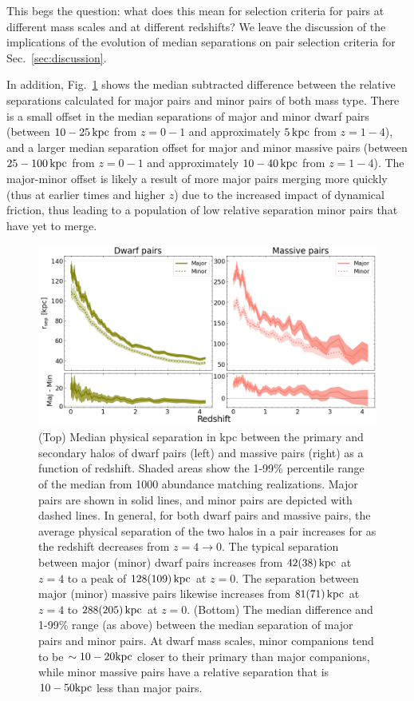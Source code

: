 \documentclass[twocolumn]{aastex631}
\begin{document}
This begs the question: what does this mean for selection criteria for pairs at different mass scales and at different redshifts? We leave the discussion of the implications of the evolution of median separations on pair selection criteria for Sec.~\ref{sec:discussion}. 



In addition, Fig.~\ref{fig:sep} shows the median subtracted difference between the relative separations calculated for major pairs and minor pairs of both mass type. 
There is a small offset in the median separations of major and minor dwarf pairs (between $10-25\,\mathrm{kpc}$ from  $z=0-1$ and approximately $5\,\mathrm{kpc}$ from $z=1-4$), and a larger median separation offset for major and minor massive pairs (between $25-100\,\mathrm{kpc}$ from  $z=0-1$ and approximately $10-40\,\mathrm{kpc}$ from $z=1-4$). 
The major-minor offset is likely a result of more major pairs merging more quickly (thus at earlier times and higher $z$) due to the increased impact of dynamical friction, thus leading to a population of low relative separation minor pairs that have yet to merge.  




\begin{figure}[htp]
  \centering
  \includegraphics[width=\textwidth]{sep_1000.png}
  \caption{(Top) Median physical separation in kpc between the primary and secondary halos of dwarf pairs (left) and massive pairs (right) as a function of redshift. 
  Shaded areas show the 1-99\% percentile range of the median from 1000 abundance matching realizations. 
  Major pairs are shown in solid lines, and minor pairs are depicted with dashed lines.
  In general, for both dwarf pairs and massive pairs, the average physical separation of the two halos in a pair increases for as the redshift decreases from $z=4\to0$. 
  The typical separation between major (minor) dwarf pairs increases from $42(38)\,\mathrm{kpc}$ at $z=4$ to a peak of $128(109)\,\mathrm{kpc}$ at $z=0$.
  The separation between major (minor) massive pairs likewise increases from $81(71)\,\mathrm{kpc}$ at $z=4$ to $288(205)\,\mathrm{kpc}$ at  $z=0$.
  (Bottom) The median difference and 1-99\% range (as above) between the median separation of major pairs and minor pairs.
  At dwarf mass scales, minor companions tend to be $\sim10-20\mathrm{kpc}$ closer to their primary than major companions, while minor massive pairs have a relative separation that is $10-50\mathrm{kpc}$ less than major pairs.
    }
  \label{fig:sep}
\end{figure}
\end{document}
